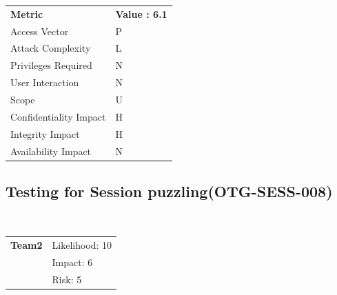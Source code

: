 \documentclass[headsepline,footsepline,footinclude=false,oneside,fontsize=11pt,paper=a4,listof=totoc,bibliography=totoc]{scrbook} %
\begin{document}
\begin{center}
	\begin{tabular}{ll}
		\rowcolor[HTML]{34CDF9}
		{\color[HTML]{ECF4FF} \textbf{Metric}}        & {\color[HTML]{ECF4FF} \textbf{Value : 6.1}} \\
		\rowcolor[HTML]{BBDAFF}
		{\color[HTML]{333333} Access Vector}          & {\color[HTML]{333333} } P             \\
		\rowcolor[HTML]{ECF4FF}
		{\color[HTML]{333333} Attack Complexity}      & {\color[HTML]{333333} } L              \\
		\rowcolor[HTML]{BBDAFF}
		{\color[HTML]{333333} Privileges Required}    & {\color[HTML]{333333} } N              \\
		\rowcolor[HTML]{ECF4FF}
		{\color[HTML]{333333} User Interaction}       & {\color[HTML]{333333} } N              \\
		\rowcolor[HTML]{BBDAFF}
		{\color[HTML]{333333} Scope}                  & {\color[HTML]{333333} } U              \\
		\rowcolor[HTML]{ECF4FF}
		{\color[HTML]{333333} Confidentiality Impact} & {\color[HTML]{333333} } H              \\
		\rowcolor[HTML]{BBDAFF}
		{\color[HTML]{333333} Integrity Impact}       & {\color[HTML]{333333} } H              \\
		\rowcolor[HTML]{ECF4FF}
		{\color[HTML]{333333} Availability Impact}    & {\color[HTML]{333333} } N
	\end{tabular}
\end{center}

\pagebreak
\subsection{Testing for Session puzzling(OTG-SESS-008)}\

\begin{tabular}{cR{12cm}}
	\textbf{Team2} & Likelihood: 10\\& Impact: 6\\& Risk: 5
\end{tabular}
\end{document}
